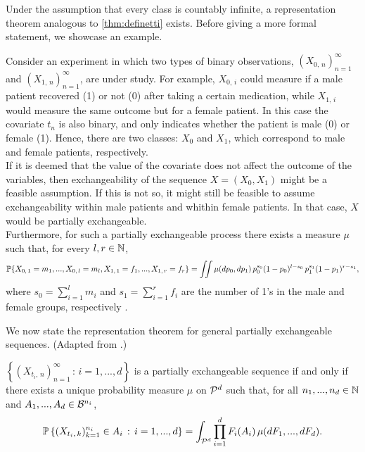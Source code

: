Under the assumption that every class is countably infinite, a representation theorem analogous to \ref{thm:definetti} exists. Before giving a more formal statement, we showcase an example.


\begin{mdframed}[backgroundcolor=mygray] 
	\begin{example} 
		Consider an experiment in which two types of binary observations, $(X_{0, \, n})_{n=1}^{\infty}$ and $(X_{1, \, n})_{n=1}^{\infty}$, are under study. For example, $X_{0, \, i}$ could measure if a male patient recovered (1) or not (0) after taking a certain medication, while $X_{1, \, i}$ would measure the same outcome but for a female patient. In this case the covariate $t_n$ is also binary, and only indicates whether the patient is male (0) or female (1). Hence, there are two classes: $X_0$ and $X_1$, which correspond to male and female patients, respectively. \\
		
		If it is deemed that the value of the covariate does not affect the outcome of the variables, then exchangeability of the sequence $X = (X_0, X_1)$ might be a feasible assumption. If this is not so, it might still be feasible to assume exchangeability within male patients and whithin female patients. In that case, $X$ would be partially exchangeable. \\
		
		Furthermore, for such a partially exchangeable process there exists a measure $\mu$ such that, for every $l, r \in \mathbb{N}$,
				\begin{equation*}
			\mathbb{P} \{ X_{0, \, 1} = m_1, ..., X_{0, \, l} = m_l, X_{1, \, 1} = f_1, ..., X_{1, \, r} = f_r \} = \iint  \mu(dp_0, dp_1) \, p_0^{s_0} (1-p_0)^{l-s_0} \, p_1^{s_1} (1-p_1)^{r-s_1},
		\end{equation*}
		where $s_0 = \sum_{i=1}^l m_i$ and $s_1 = \sum_{i=1}^r f_i$ are the number of 1's in the male and female groups, respectively \cite[][p.~112-113]{Diaconis:1988:PartialExchang}.
	\end{example}
\end{mdframed}

We now state the representation theorem for general partially exchangeable sequences. (Adapted from \cite[][p.~69]{CamerlenghiEtAl:2019:partial_exchang_hierarchical}.)


\begin{theorem} \label{thm:definetti_partial}
	$\left\{ (X_{t_i, \, n})_{n=1}^{\infty} \, : \, i=1, ..., d \right\}$ is a partially exchangeable sequence if and only if there exists a unique probability measure $\mu$ on $\mathcal{P}^d$ such that, for all $n_1, ..., n_d \in \mathbb{N}$ and $A_1, ..., A_d \in \mathcal{B}^{n_i}$,
	\begin{equation} \label{eq:definetti_partial_thm}
		\mathbb{P} \left\{ (X_{t_i, \, k})_{k=1}^{n_i} \in A_i \, : \, i=1, ..., d  \right\} = \int_{\mathcal{P}^d}  \prod_{i=1}^d F_i(A_i) \, \mu(dF_1, ..., dF_d).
	\end{equation}
\end{theorem}



